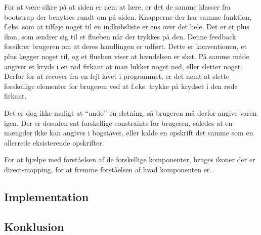 For at være sikre på at siden er nem at lære, er det de samme klasser fra bootstrap der benyttes rundt om på siden. 
Knapperne der har samme funktion, f.eks. som at tilføje noget til en indkøbsliste er ens over det hele. 
Det er et plus ikon, som ændrer sig til et flueben når der trykkes på den.
Denne feedback forsikrer brugeren om at deres handlingen er udført.
Dette er konventionen, et plus lægger noget til, og et flueben viser at hændelsen er sket.
På samme måde angiver et kryds i en rød firkant at man lukker noget ned, eller sletter noget.
Derfor for at recover fra en fejl lavet i programmet, er det nemt at slette forskellige elementer for brugeren ved at f.eks. trykke på krydset i den røde firkant.

Det er dog ikke muligt at ``undo'' en sletning, så brugeren må derfor angive varen igen.
Der er desuden sat forskellige constraints for brugeren, således at en mængder ikke kan angives i bogstaver, eller kalde en opskrift det samme som en allerrede eksisterende opskrifter.

For at hjælpe med forståelsen af de forskellige komponenter, bruges ikoner der er direct-mapping, for at fremme forståelsen af hvad komponenten er.

	
	
\subsection{Implementation}
\subsection{Konklusion}